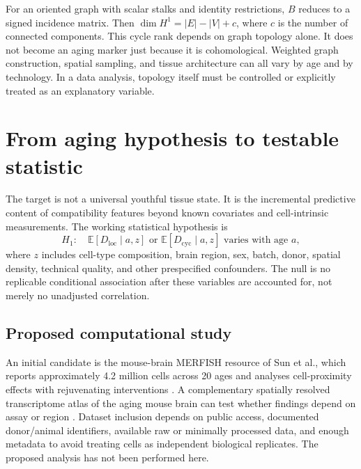 \documentclass[11pt]{article}
\newcommand{\E}{\mathbb{E}}
\begin{document}
For an oriented graph with scalar stalks and identity restrictions, $B$ reduces to a signed incidence matrix. Then $\dim H^1=|E|-|V|+c$, where $c$ is the number of connected components. This cycle rank depends on graph topology alone. It does not become an aging marker just because it is cohomological. Weighted graph construction, spatial sampling, and tissue architecture can all vary by age and by technology. In a data analysis, topology itself must be controlled or explicitly treated as an explanatory variable.

\section{From aging hypothesis to testable statistic}
The target is not a universal youthful tissue state. It is the incremental predictive content of compatibility features beyond known covariates and cell-intrinsic measurements. The working statistical hypothesis is
\[
H_1:\quad \E[D_{\mathrm{loc}}\mid a,z]\text{ or }\E[D_{\mathrm{cyc}}\mid a,z]\text{ varies with age }a,
\]
where $z$ includes cell-type composition, brain region, sex, batch, donor, spatial density, technical quality, and other prespecified confounders. The null is no replicable conditional association after these variables are accounted for, not merely no unadjusted correlation.

\subsection{Proposed computational study}
An initial candidate is the mouse-brain MERFISH resource of Sun et al., which reports approximately 4.2 million cells across 20 ages and analyses cell-proximity effects with rejuvenating interventions \cite{sun2025}. A complementary spatially resolved transcriptome atlas of the aging mouse brain can test whether findings depend on assay or region \cite{wu2024}. Dataset inclusion depends on public access, documented donor/animal identifiers, available raw or minimally processed data, and enough metadata to avoid treating cells as independent biological replicates. The proposed analysis has not been performed here.
\end{document}
